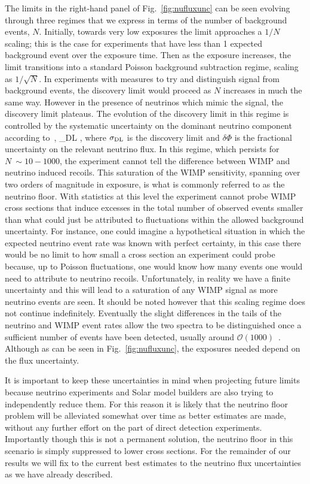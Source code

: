 The limits in the right-hand panel of Fig.~\ref{fig:nufluxunc} can be seen evolving through three regimes that we express in terms of the number of background events, $N$. Initially, towards very low exposures the limit approaches a $1/N$ scaling; this is the case for experiments that have less than 1 expected background event over the exposure time. Then as the exposure increases, the limit transitions into a standard Poisson background subtraction regime, scaling as $1/\sqrt{N}$. In experiments with measures to try and distinguish signal from background events, the discovery limit would proceed as $N$ increases in much the same way. However in the presence of neutrinos which mimic the signal, the discovery limit plateaus. The evolution of the discovery limit in this regime is controlled by the systematic uncertainty on the dominant neutrino component according to~\cite{Billard:2013qya},
\be
\sigma_{\rm DL} \propto {},
\ee
where $\sigma_{\rm DL}$ is the discovery limit and $\delta \Phi$ is the fractional uncertainty on the relevant neutrino flux. In this regime, which persists for $N~\sim 10-1000$, the experiment cannot tell the difference between WIMP and neutrino induced recoils. This saturation of the WIMP sensitivity, spanning over two orders of magnitude in exposure, is what is commonly referred to as the neutrino floor. With statistics at this level the experiment cannot probe WIMP cross sections that induce excesses in the total number of observed events smaller than what could just be attributed to fluctuations within the allowed background uncertainty. For instance, one could imagine a hypothetical situation in which the expected neutrino event rate was known with perfect certainty, in this case there would be no limit to how small a cross section an experiment could probe because, up to Poisson fluctuations, one would know how many events one would need to attribute to neutrino recoils. Unfortunately, in reality we have a finite uncertainty and this will lead to a saturation of any WIMP signal as more neutrino events are seen. It should be noted however that this scaling regime does not continue indefinitely. Eventually the slight differences in the tails of the neutrino and WIMP event rates allow the two spectra to be distinguished once a sufficient number of events have been detected, usually around $\mathcal{O}(1000)$~\cite{Ruppin:2014bra}. Although as can be seen in Fig.~\ref{fig:nufluxunc}, the exposures needed depend on the flux uncertainty.

It is important to keep these uncertainties in mind when projecting future limits because neutrino experiments and Solar model builders are also trying to independently reduce them. For this reason it is likely that the neutrino floor problem will be alleviated somewhat over time as better estimates are made, without any further effort on the part of direct detection experiments. Importantly though this is not a permanent solution, the neutrino floor in this scenario is simply suppressed to lower cross sections. For the remainder of our results we will fix to the current best estimates to the neutrino flux uncertainties as we have already described.

